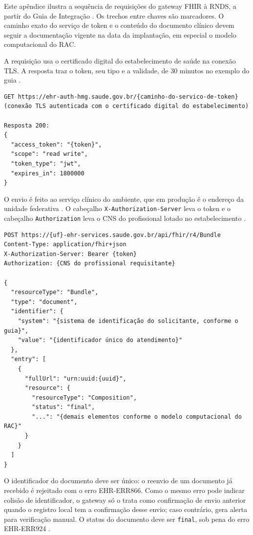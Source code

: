 Este apêndice ilustra a sequência de requisições do gateway FHIR à RNDS, a partir do Guia de Integração \cite{rndsconector, rndsambientes, rndserros}. Os trechos entre chaves são marcadores. O caminho exato do serviço de token e o conteúdo do documento clínico devem seguir a documentação vigente na data da implantação, em especial o modelo computacional do RAC.

\medskip{}\par\smallskip

A requisição usa o certificado digital do estabelecimento de saúde na conexão TLS. A resposta traz o token, seu tipo e a validade, de 30 minutos no exemplo do guia \cite{rndsconector}.

\begin{lstlisting}
GET https://ehr-auth-hmg.saude.gov.br/{caminho-do-servico-de-token}
(conexão TLS autenticada com o certificado digital do estabelecimento)

Resposta 200:
{
  "access_token": "{token}",
  "scope": "read write",
  "token_type": "jwt",
  "expires_in": 1800000
}
\end{lstlisting}

\medskip{}\par\smallskip

O envio é feito ao serviço clínico do ambiente, que em produção é o endereço da unidade federativa \cite{rndsambientes}. O cabeçalho \texttt{X-Authorization-Server} leva o token e o cabeçalho \texttt{Authorization} leva o CNS do profissional lotado no estabelecimento \cite{rndsconector, rndserros}.

\begin{lstlisting}
POST https://{uf}-ehr-services.saude.gov.br/api/fhir/r4/Bundle
Content-Type: application/fhir+json
X-Authorization-Server: Bearer {token}
Authorization: {CNS do profissional requisitante}

{
  "resourceType": "Bundle",
  "type": "document",
  "identifier": {
    "system": "{sistema de identificação do solicitante, conforme o guia}",
    "value": "{identificador único do atendimento}"
  },
  "entry": [
    {
      "fullUrl": "urn:uuid:{uuid}",
      "resource": {
        "resourceType": "Composition",
        "status": "final",
        "...": "{demais elementos conforme o modelo computacional do RAC}"
      }
    }
  ]
}
\end{lstlisting}

O identificador do documento deve ser único: o reenvio de um documento já recebido é rejeitado com o erro EHR-ERR866. Como o mesmo erro pode indicar colisão de identificador, o gateway só o trata como confirmação de envio anterior quando o registro local tem a confirmação desse envio; caso contrário, gera alerta para verificação manual. O status do documento deve ser \texttt{final}, sob pena do erro EHR-ERR924 \cite{rndserros}.
